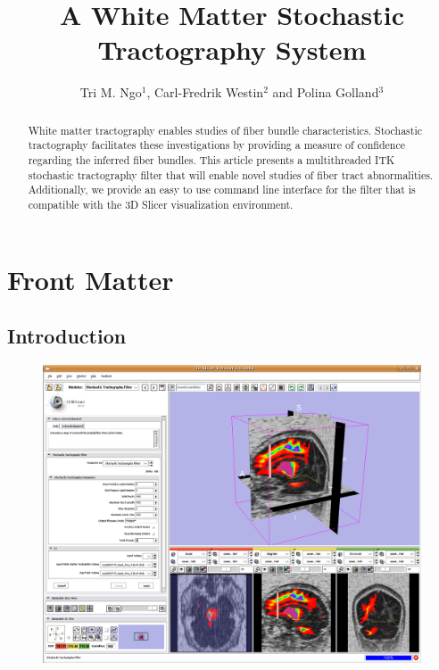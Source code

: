 \documentclass{InsightArticle}
\title{A White Matter Stochastic Tractography System}
\author{Tri M. Ngo$^{1}$, Carl-Fredrik Westin$^{2}$ and Polina Golland$^{3}$}
\begin{document}
\ifpdf
\else
\fi


\maketitle


\ifhtml
\chapter*{Front Matter\label{front}}
\fi


\begin{abstract}
\noindent
White matter tractography enables studies of fiber bundle characteristics.  Stochastic tractography facilitates these investigations by providing a measure of confidence regarding the inferred fiber bundles.  This article presents a multithreaded ITK stochastic tractography filter that will enable novel studies of fiber tract abnormalities.  Additionally, we provide an easy to use command line interface for the filter that is compatible with the 3D Slicer visualization environment.
\end{abstract}

\tableofcontents

\section{Introduction}

\begin{figure}
\center
	\includegraphics[width=0.75\linewidth]{slicerinterface}
	\label{fig:Intro}
\end{figure}
\end{document}
